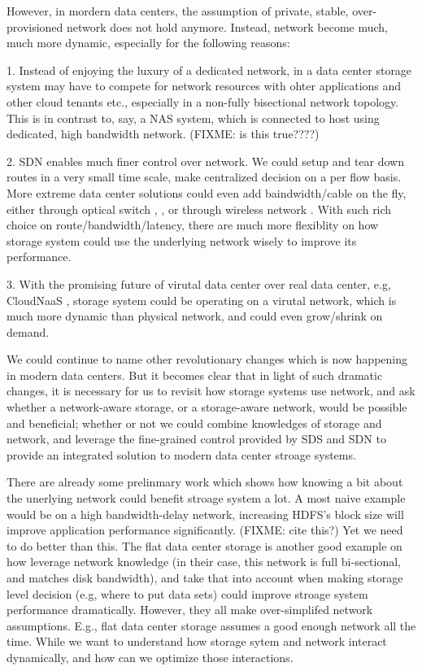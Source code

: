 However, in mordern data centers, the assumption of private, stable, over-provisioned network does not hold anymore. Instead, network become much, much more dynamic, especially for the following reasons:



1. Instead of enjoying the luxury of a dedicated network, in a data center storage system may have to compete for network resources with ohter applications and other cloud tenants etc., especially in a non-fully bisectional network topology. This is in contrast to, say, a NAS system, which is connected to host using dedicated, high bandwidth network. (FIXME: is this true????)

2. SDN enables much finer control over network. We could setup and tear down routes in a very small time scale, make centralized decision on a per flow basis. More extreme data center solutions could even add baindwidth/cable on the fly, either through optical switch \cite{c-through}, \cite{Hellio}, or through wireless network \cite{flyways}. With such rich choice on route/bandwidth/latency, there are much more flexiblity on how storage system could use the underlying network wisely to improve its performance.

3. With the promising future of virutal data center over real data center, e.g, CloudNaaS \cite{cloud-naas}, storage system could be operating on a virutal network, which is much more dynamic than physical network, and could even grow/shrink on demand.

We could continue to name other revolutionary changes which is now happening in modern data centers. But it becomes clear that in light of such dramatic changes, it is necessary for us to revisit how storage systems use network, and ask whether a network-aware storage, or a storage-aware network, would be possible and beneficial; whether or not we could combine knowledges of storage and network, and leverage the fine-grained control provided by SDS and SDN to provide an integrated solution to modern data center stroage systems.

There are already some prelinmary work which shows how knowing a bit about the unerlying network could benefit stroage system a lot. A most naive example would be on a high bandwidth-delay network, increasing HDFS's block size will improve application performance significantly. (FIXME: cite this?) Yet we need to do better than this. The flat data center storage \cite{fds} is another good example on how leverage network knowledge (in their case, this network is full bi-sectional, and matches disk bandwidth), and take that into account when making storage level decision (e.g, where to put data sets) could improve stroage system performance dramatically. However, they all make over-simplifed network assumptions. E.g., flat data center storage assumes a good enough network all the time. While we want to understand how storage sytem and network interact dynamically, and how can we optimize those interactions.






